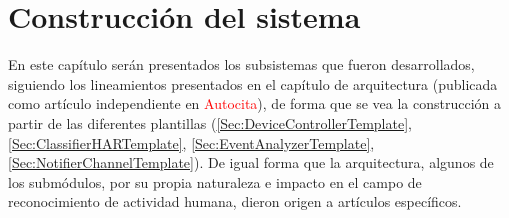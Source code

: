 \chapter{Construcción del sistema}
\label{chap:SystemConstruction}

En este capítulo serán presentados los subsistemas que fueron desarrollados, siguiendo los lineamientos presentados en el capítulo de arquitectura (publicada como artículo independiente en \textcolor{red}{Autocita}), de forma que se vea la construcción a partir de las diferentes plantillas (\ref{Sec:DeviceControllerTemplate}, \ref{Sec:ClassifierHARTemplate}, \ref{Sec:EventAnalyzerTemplate}, \ref{Sec:NotifierChannelTemplate}). De igual forma que la arquitectura, algunos de los submódulos, por su propia naturaleza e impacto en el campo de reconocimiento de actividad humana, dieron origen a artículos específicos.

